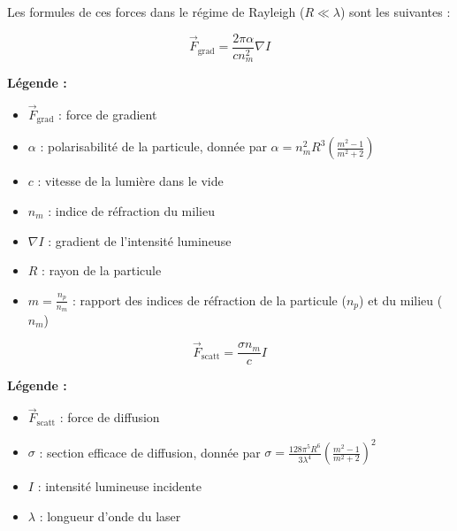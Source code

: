 Les formules de ces forces dans le régime de Rayleigh (\( R \ll \lambda \)) sont les suivantes :


\begin{equation}
    \vec{F}_{\text{grad}} = \frac{2\pi \alpha}{c n_m^2} \nabla I
\end{equation}

\textbf{Légende :}
\begin{itemize}[label=\textbullet]
    \item \( \vec{F}_{\text{grad}} \) : force de gradient
    \item \( \alpha \) : polarisabilité de la particule, donnée par \( \alpha = n_m^2 R^3 \left(\frac{m^2 - 1}{m^2 + 2}\right) \)
    \item \( c \) : vitesse de la lumière dans le vide
    \item \( n_m \) : indice de réfraction du milieu
    \item \( \nabla I \) : gradient de l'intensité lumineuse
    \item \( R \) : rayon de la particule
    \item \( m = \frac{n_p}{n_m} \) : rapport des indices de réfraction de la particule (\( n_p \)) et du milieu (\( n_m \))
\end{itemize}

\begin{equation}
    \vec{F}_{\text{scatt}} = \frac{\sigma n_m}{c} I
\end{equation}

\textbf{Légende :}
\begin{itemize}[label=\textbullet]
    \item \( \vec{F}_{\text{scatt}} \) : force de diffusion
    \item \( \sigma \) : section efficace de diffusion, donnée par \( \sigma = \frac{128\pi^5 R^6}{3 \lambda^4} \left( \frac{m^2 - 1}{m^2 + 2} \right)^2 \)
    \item \( I \) : intensité lumineuse incidente
    \item \( \lambda \) : longueur d'onde du laser
\end{itemize}

\newpage
